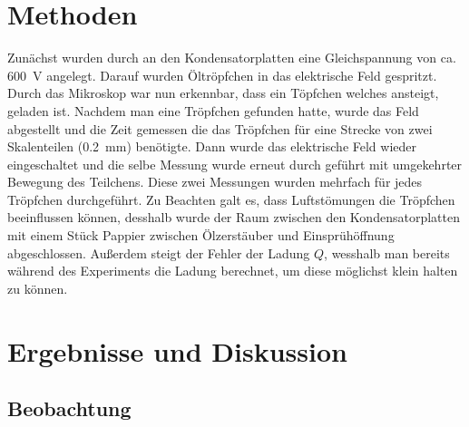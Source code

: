 \documentclass[
	a4paper,
	12pt,
	pagesize,
	ngerman
]{scrartcl}
\begin{document}
	\section{Methoden}
	Zunächst wurden durch an den Kondensatorplatten eine Gleichspannung von ca. \SI{600}{V} angelegt. 
	Darauf wurden Öltröpfchen in das elektrische Feld gespritzt.
	Durch das Mikroskop war nun erkennbar, dass ein Töpfchen welches ansteigt, geladen ist.
	Nachdem man eine Tröpfchen gefunden hatte, wurde das Feld abgestellt und die Zeit gemessen die das Tröpfchen für eine Strecke von zwei Skalenteilen (\SI{0,2}{mm}) benötigte. 
	Dann wurde das elektrische Feld wieder eingeschaltet und die selbe Messung wurde erneut durch geführt mit umgekehrter Bewegung des Teilchens.
	Diese zwei Messungen wurden mehrfach für jedes Tröpfchen durchgeführt. 
	Zu Beachten galt es, dass Luftstömungen die Tröpfchen beeinflussen können, desshalb wurde der Raum zwischen den Kondensatorplatten mit einem Stück Pappier zwischen Ölzerstäuber und Einsprühöffnung abgeschlossen.
	Außerdem steigt der Fehler der Ladung $Q$, wesshalb man bereits während des Experiments die Ladung berechnet, um diese möglichst klein halten zu können.

	
	\section{Ergebnisse und Diskussion}
	

	\subsection{Beobachtung}
\end{document}
